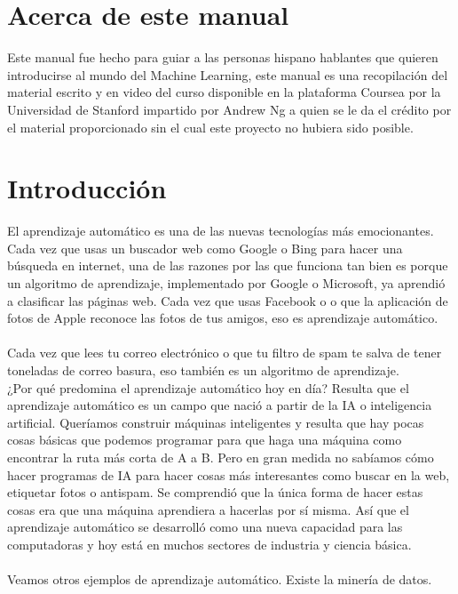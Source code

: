 \documentclass{report}
\begin{document}


\renewcommand{\tablename}{Tabla}
\renewcommand{\listtablename}{Índice de tablas}
\tableofcontents
\listoffigures
\listoftables

\chapter*{Acerca de este manual}
Este manual fue hecho para guiar a las personas hispano hablantes que quieren introducirse al mundo del Machine Learning, este manual es una recopilación del material escrito y en video del curso disponible en la plataforma Coursea por la Universidad de Stanford impartido por Andrew Ng a quien se le da el crédito por el material proporcionado sin el cual este proyecto no hubiera sido posible. 
\chapter{Introducción}
El aprendizaje automático es una
de las nuevas tecnologías más emocionantes. Cada vez que usas un buscador web como Google o Bing para hacer una
búsqueda en internet, una de las razones por las que funciona tan bien es porque
un algoritmo de aprendizaje, implementado por Google o Microsoft, ya aprendió a clasificar las
páginas web. Cada vez que usas Facebook o o que la aplicación de fotos de Apple
reconoce las fotos de tus amigos, eso es aprendizaje automático. \\\\Cada vez que lees
tu correo electrónico o que tu filtro de spam te salva de tener toneladas de correo basura,
eso también es un algoritmo de aprendizaje.\\¿Por qué
predomina el aprendizaje automático hoy en día? Resulta que el aprendizaje automático es un
campo que nació a partir de la IA o inteligencia artificial. Queríamos
construir máquinas inteligentes y resulta que hay pocas cosas básicas que
podemos programar para que haga una máquina como encontrar la ruta más corta de A a B.
Pero en gran medida no sabíamos cómo hacer programas de IA para hacer cosas
más interesantes como buscar en la web, etiquetar fotos o antispam. Se comprendió
que la única forma de hacer estas cosas era que una máquina aprendiera
a hacerlas por sí misma. Así que el aprendizaje automático se desarrolló como una nueva capacidad
para las computadoras y hoy está en muchos sectores de industria y ciencia básica.\\\\Veamos otros ejemplos de aprendizaje automático. Existe la minería de datos.
\end{document}
